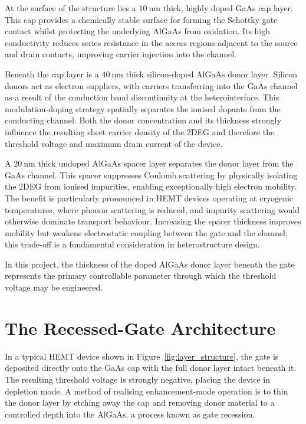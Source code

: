 \vspace{2mm}
At the surface of the structure lies a $10~\text{nm}$ thick, highly doped
GaAs cap layer. This cap provides a chemically stable surface for forming
the Schottky gate contact whilst protecting the underlying AlGaAs from oxidation. Its
high conductivity reduces series resistance in the access regions adjacent
to the source and drain contacts, improving carrier injection into the
channel.

\vspace{2mm}
Beneath the cap layer is a $40~\text{nm}$ thick silicon-doped AlGaAs
donor layer. Silicon donors act as electron suppliers, with carriers
transferring into the GaAs channel as a result of the conduction band
discontinuity at the heterointerface. This modulation-doping strategy
spatially separates the ionised dopants from the conducting channel.
Both the donor concentration and its thickness strongly influence the
resulting sheet carrier density of the 2DEG and therefore the threshold
voltage and maximum drain current of the device.

\vspace{2mm}
A $20~\text{nm}$ thick undoped AlGaAs spacer layer separates the donor
layer from the GaAs channel. This spacer suppresses Coulomb scattering
by physically isolating the 2DEG from ionised impurities, enabling
exceptionally high electron mobility. \cite{Hirakawa1986} The benefit is
particularly pronounced in HEMT devices operating at cryogenic
temperatures, where phonon scattering is reduced, and impurity scattering
would otherwise dominate transport behaviour. \cite{Pfeiffer1989}
Increasing the spacer thickness improves mobility but weakens
electrostatic coupling between the gate and the channel; this trade-off
is a fundamental consideration in heterostructure design.

\vspace{2mm}
In this project, the thickness of the doped AlGaAs donor layer beneath
the gate represents the primary controllable parameter through which the
threshold voltage may be engineered.

\section{The Recessed-Gate Architecture}

In a typical HEMT device shown in Figure~\ref{fig:layer_structure}, the gate
is deposited directly onto the GaAs cap with the full donor layer intact beneath it.
The resulting threshold voltage is strongly negative, placing the device in depletion
mode. A method of realising enhancement-mode operation is to thin the donor layer by 
etching away the cap and removing donor material to a controlled depth into the AlGaAs, 
a process known as gate recession.

